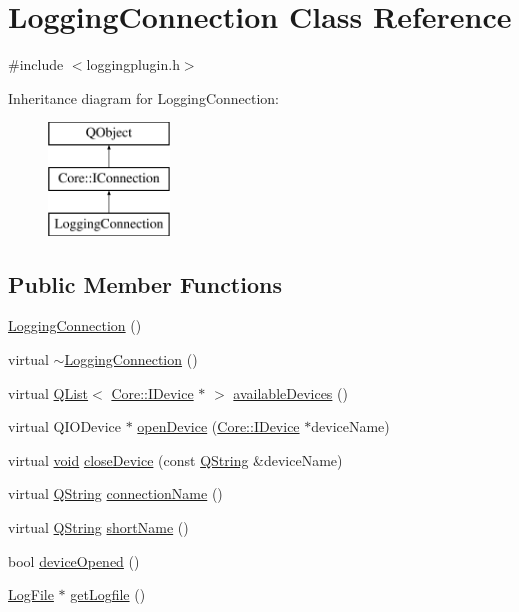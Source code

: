 \hypertarget{class_logging_connection}{\section{Logging\-Connection Class Reference}
\label{class_logging_connection}
}


{\ttfamily \#include $<$loggingplugin.\-h$>$}

Inheritance diagram for Logging\-Connection\-:\begin{figure}[H]
\begin{center}
\leavevmode
\includegraphics[height=3.000000cm]{class_logging_connection}
\end{center}
\end{figure}
\subsection*{Public Member Functions}
\begin{DoxyCompactItemize}
\item 
\hyperlink{group___logging_ga4e4cd5c90f83710ae2807a8257db1c70}{Logging\-Connection} ()
\item 
virtual \hyperlink{group___logging_ga0d9d6cd072a5b35292b5e4ffeda50fcd}{$\sim$\-Logging\-Connection} ()
\item 
virtual \hyperlink{class_q_list}{Q\-List}$<$ \hyperlink{class_core_1_1_i_device}{Core\-::\-I\-Device} $\ast$ $>$ \hyperlink{group___logging_ga0ed63dc5111dcd536bacc7655b878e8f}{available\-Devices} ()
\item 
virtual Q\-I\-O\-Device $\ast$ \hyperlink{group___logging_ga592075585208489ed59844d9d7175015}{open\-Device} (\hyperlink{class_core_1_1_i_device}{Core\-::\-I\-Device} $\ast$device\-Name)
\item 
virtual \hyperlink{group___u_a_v_objects_plugin_ga444cf2ff3f0ecbe028adce838d373f5c}{void} \hyperlink{group___logging_gaeb291639744d4248ab7422d57444ea0a}{close\-Device} (const \hyperlink{group___u_a_v_objects_plugin_gab9d252f49c333c94a72f97ce3105a32d}{Q\-String} \&device\-Name)
\item 
virtual \hyperlink{group___u_a_v_objects_plugin_gab9d252f49c333c94a72f97ce3105a32d}{Q\-String} \hyperlink{group___logging_gaca41f5a7a58289c24cdf4975b9718091}{connection\-Name} ()
\item 
virtual \hyperlink{group___u_a_v_objects_plugin_gab9d252f49c333c94a72f97ce3105a32d}{Q\-String} \hyperlink{group___logging_gaf569eb0407d501102e1257c067a05295}{short\-Name} ()
\item 
bool \hyperlink{class_logging_connection_a93a0206c7700583ac02392c6b7f254a4}{device\-Opened} ()
\item 
\hyperlink{class_log_file}{Log\-File} $\ast$ \hyperlink{class_logging_connection_ae125e5d696178c272287548b0707f9ce}{get\-Logfile} ()
\end{DoxyCompactItemize}
